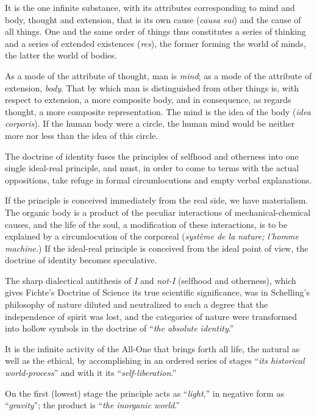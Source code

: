 \documentclass[12pt,a4paper,openany]{book}
\newcommand{\opage}[1]{\marginnote{\footnotesize\textit{[#1]}}}
\begin{document}
It is the one infinite substance, with its attributes corresponding to mind and body, thought and extension, that is
its own cause (\textit{causa sui}) and the cause of all things. One and the same order of things thus constitutes a
series of thinking and a series of extended existences (\textit{res}), the former forming the world of minds, the latter
the world of bodies.

As a mode of the attribute of thought, man is \emph{mind}; as a mode of the attribute of extension, \emph{body}. That by
which man is distinguished from other things is, with respect to extension, a more composite body, and in consequence,
as regards thought, a more composite representation. The mind is the idea of the body (\textit{idea corporis}). If the
human body were a circle, the human mind would be neither more nor less than the idea of this circle.

The doctrine of identity fuses the principles of selfhood and otherness into one single ideal-real principle, and must,
in order to come to terms with the actual oppositions, take refuge in formal circumlocutions and empty verbal
explanations.

If the principle is conceived immediately from the real side, we have materialism. The organic body is a product of the
peculiar interactions of mechanical-chemical causes, and the life of the soul, a modification of these interactions, is
to be explained by a circumlocution of the corporeal (\textit{système de la nature; l’homme machine.}) If the ideal-real
principle is
\opage{4}conceived from the ideal point of view, the doctrine of identity becomes speculative.

The sharp dialectical antithesis of \emph{I} and \emph{not-I} (selfhood and otherness), which gives Fichte's Doctrine of
Science its true scientific significance, was in Schelling's philosophy of nature diluted and neutralized to such a
degree that the independence of spirit was lost, and the categories of nature were transformed into hollow symbols in
the doctrine of “\emph{the absolute identity}.”

It is the infinite activity of the All-One that brings forth all life, the natural as well as the ethical, by
accomplishing in an ordered series of stages “\emph{its historical world-process}” and with it its
“\emph{self-liberation}.”

On the first (lowest) stage the principle acts as “\emph{light},” in negative form as “\emph{gravity}”; the product is
“\emph{the inorganic world}.”
\end{document}
